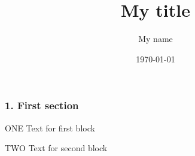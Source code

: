 \documentclass{beamer}
\begin{document}
\title{My title}  
\author{My name}
\date{\today} 
\begin{frame}
\titlepage
\end{frame}
\begin{frame}
\frametitle{1. First section}

{
\begin{block}{ONE} 
Text for first block
\end{block}
}

\begin{block}{TWO}
Text for second block
\end{block}
\end{frame}
\end{document}
